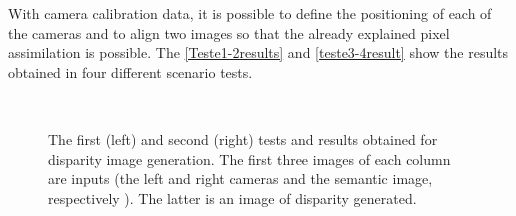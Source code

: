     With camera calibration data, it is possible to define the positioning of each of the cameras and to align two images so that the already explained pixel assimilation is possible. The \autoref{Teste1-2results} and \autoref{teste3-4result} show the results obtained in four different scenario tests.

\begin{figure}[H]
  \centering
  \caption{
    The first (left) and second (right) tests and results obtained for disparity image generation. The first three images of each column are inputs (the left and right cameras and the semantic image, respectively \cite{giovaniThesis}). The latter is an image of disparity generated.}
  \label{Teste1-2results}
  \mbox{%
    \qquad
    }
    \mbox{%
    \qquad
    }
    \mbox{%
    \qquad
}
\end{figure}
